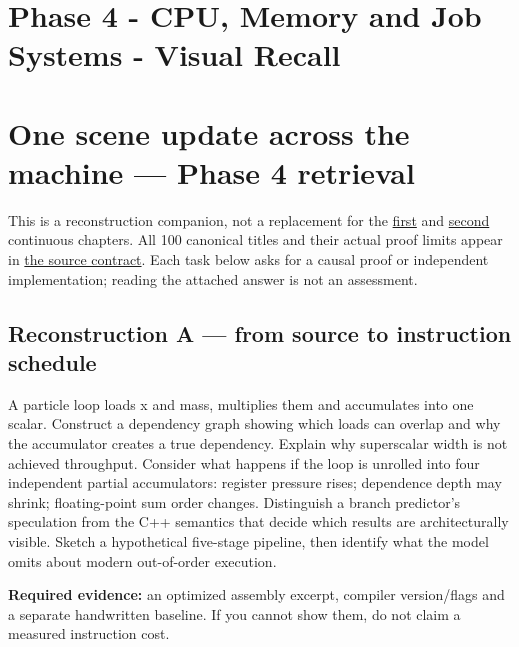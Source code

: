 \hypertarget{appendix-2587680a4fe3}{}
\section*{Phase 4 - CPU, Memory and Job Systems - Visual Recall}
\section{One scene update across the machine --- Phase 4 retrieval}\label{one-scene-update-across-the-machine-phase-4-retrieval}

This is a reconstruction companion, not a replacement for the \href{Continuous\%20Notes/Computing\%20Foundations\%20-\%20From\%20Bits\%20to\%20C++\%20and\%20Systems\%20APIs\#From\%20a\%20correct\%20C++\%20asset\%20service\%20to\%20the\%20instructions\%20a\%20CPU\%20can\%20execute\%20—\%20Phase\%204,\%20M019–M021,\%20Parts\%20301–346}{first} and \href{Continuous\%20Notes/Computing\%20Foundations\%20-\%20From\%20Bits\%20to\%20C++\%20and\%20Systems\%20APIs\#From\%20temporary\%20memory\%20to\%20finished\%20parallel\%20frames\%20—\%20Phase\%204,\%20M022–M024,\%20Parts\%20347–400}{second} continuous chapters. All 100 canonical titles and their actual proof limits appear in \hyperref[appendix-fd090d982a15]{the source contract}. Each task below asks for a causal proof or independent implementation; reading the attached answer is not an assessment.

\subsection{Reconstruction A --- from source to instruction schedule}\label{reconstruction-a-from-source-to-instruction-schedule}

A particle loop loads x and mass, multiplies them and accumulates into one scalar. Construct a dependency graph showing which loads can overlap and why the accumulator creates a true dependency. Explain why superscalar width is not achieved throughput. Consider what happens if the loop is unrolled into four independent partial accumulators: register pressure rises; dependence depth may shrink; floating-point sum order changes. Distinguish a branch predictor's speculation from the C++ semantics that decide which results are architecturally visible. Sketch a hypothetical five-stage pipeline, then identify what the model omits about modern out-of-order execution.

\textbf{Required evidence:} an optimized assembly excerpt, compiler version/flags and a separate handwritten baseline. If you cannot show them, do not claim a measured instruction cost.

